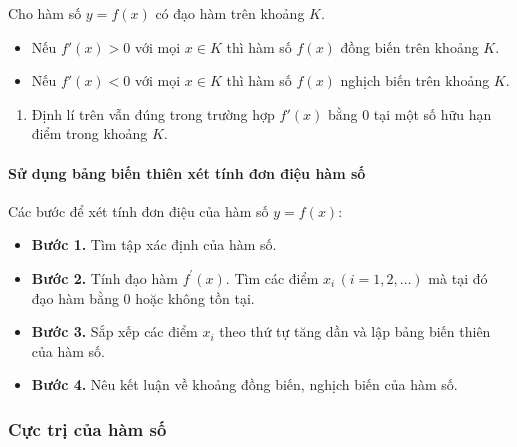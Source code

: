     \begin{dn}
        Cho hàm số $y=f(x)$ có đạo hàm trên khoảng $K$.
        \begin{itemize}
            \item  Nếu $f'(x)>0$ với mọi $x \in K$ thì hàm số $f(x)$ đồng biến trên khoảng $K$.
            \item  Nếu $f'(x)<0$ với mọi $x \in K$ thì hàm số $f(x)$ nghịch biến trên khoảng $K$.
        \end{itemize}
    \end{dn}
        \begin{enumerate}[\bf ---]
            \item Định lí trên vẫn đúng trong trường hợp $f'(x)$ bằng $0$ tại một số hữu hạn điểm trong khoảng $K$.
        \end{enumerate}
    \paragraph{Sử dụng bảng biến thiên xét tính đơn điệu hàm số}
    \begin{dn}
        Các bước để xét tính đơn điệu của hàm số $y=f(x)$:
        \begin{itemize}
            \item {\bf Bước 1.} Tìm tập xác định của hàm số.
            \item {\bf Bước 2.} Tính đạo hàm $f^{\prime}(x)$. Tìm các điểm $x_i\,(i=1,2, \ldots)$ mà tại đó đạo hàm bằng $0$ hoặc không tồn tại.
            \item {\bf Bước 3.} Sắp xếp các điểm $x_i$ theo thứ tự tăng dần và lập bảng biến thiên của hàm số.
            \item {\bf Bước 4.} Nêu kết luận về khoảng đồng biến, nghịch biến của hàm số.
        \end{itemize}
    \end{dn}
    \subsubsection{Cực trị của hàm số}
